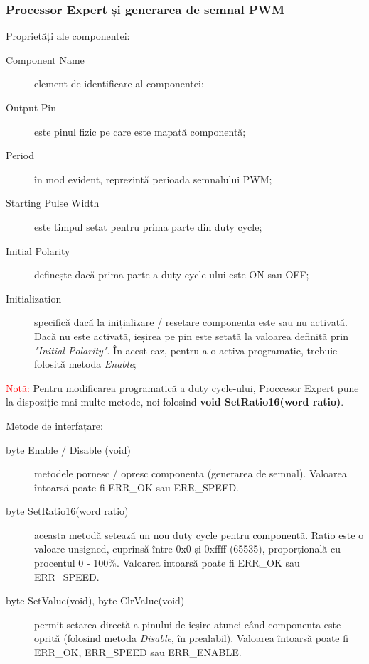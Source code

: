 \subsubsection{Processor Expert și generarea de semnal PWM}

Proprietăți ale componentei:

\begin{description}
    \item[Component Name] element de identificare al componentei;
    \item[Output Pin] este pinul fizic pe care este mapată componentă;
    \item[Period] în mod evident, reprezintă perioada semnalului PWM;
    \item[Starting Pulse Width] este timpul setat pentru prima parte din duty cycle; 
    \item[Initial Polarity] definește dacă prima parte a duty cycle-ului este ON sau OFF;
    \item[Initialization] specifică dacă la inițializare / resetare componenta este sau nu activată. Dacă nu este activată, ieșirea pe pin este setată la valoarea definită prin \textit{"Initial Polarity"}. În acest caz, pentru a o activa programatic, trebuie folosită metoda \textit{Enable}; 
\end{description}

\textcolor{red}{Notă:} Pentru modificarea programatică a duty cycle-ului, Proccesor Expert pune la dispoziție mai multe metode, noi folosind \textbf{void SetRatio16(word ratio)}.

Metode de interfațare:

\begin{description}
    \item[byte Enable / Disable (void)] metodele pornesc / opresc componenta (generarea de semnal). Valoarea întoarsă poate fi ERR\_OK sau ERR\_SPEED.
    \item[byte SetRatio16(word ratio)] aceasta metodă setează un nou duty cycle pentru componentă. Ratio este o valoare unsigned, cuprinsă între 0x0 și 0xffff (65535), proporțională cu procentul 0 - 100\%. Valoarea întoarsă poate fi ERR\_OK sau ERR\_SPEED.
    \item[byte SetValue(void), byte ClrValue(void)] permit setarea directă a pinului de ieșire atunci când componenta este oprită (folosind metoda \textit{Disable}, în prealabil). Valoarea întoarsă poate fi ERR\_OK, ERR\_SPEED sau ERR\_ENABLE.
\end{description}

